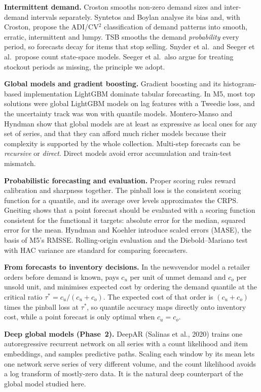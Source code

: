 \documentclass[conference]{IEEEtran}
\begin{document}
\textbf{Intermittent demand.} Croston smooths non-zero demand sizes and inter-demand intervals separately. Syntetos and Boylan analyse its bias and, with Croston, propose the ADI/CV$^2$ classification of demand patterns into smooth, erratic, intermittent and lumpy. TSB smooths the demand \emph{probability} every period, so forecasts decay for items that stop selling. Snyder et al.\ and Seeger et al.\ propose count state-space models. Seeger et al.\ also argue for treating stockout periods as missing, the principle we adopt.

\textbf{Global models and gradient boosting.} Gradient boosting and its histogram-based implementation LightGBM dominate tabular forecasting. In M5, most top solutions were global LightGBM models on lag features with a Tweedie loss, and the uncertainty track was won with quantile models. Montero-Manso and Hyndman show that global models are at least as expressive as local ones for any set of series, and that they can afford much richer models because their complexity is supported by the whole collection. Multi-step forecasts can be \emph{recursive} or \emph{direct}. Direct models avoid error accumulation and train-test mismatch.

\textbf{Probabilistic forecasting and evaluation.} Proper scoring rules reward calibration and sharpness together. The pinball loss is the consistent scoring function for a quantile, and its average over levels approximates the CRPS. Gneiting shows that a point forecast should be evaluated with a scoring function consistent for the functional it targets: absolute error for the median, squared error for the mean. Hyndman and Koehler introduce scaled errors (MASE), the basis of M5's RMSSE. Rolling-origin evaluation and the Diebold--Mariano test with HAC variance are standard for comparing forecasters.

\textbf{From forecasts to inventory decisions.} In the newsvendor model a retailer orders before demand is known, pays $c_u$ per unit of unmet demand and $c_o$ per unsold unit, and minimises expected cost by ordering the demand quantile at the critical ratio $\tau^\ast=c_u/(c_u+c_o)$. The expected cost of that order is $(c_u+c_o)$ times the pinball loss at $\tau^\ast$, so quantile accuracy maps directly onto inventory cost, while a point forecast is only optimal when $c_u=c_o$.

\textbf{Deep global models (Phase~2).} DeepAR (Salinas et al., 2020) trains one autoregressive recurrent network on all series with a count likelihood and item embeddings, and samples predictive paths. Scaling each window by its mean lets one network serve series of very different volume, and the count likelihood avoids a log transform of mostly-zero data. It is the natural deep counterpart of the global model studied here.
\end{document}
